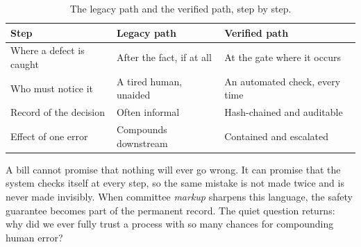 \begin{table}[H]
\footnotesize
\begin{tabularx}{\textwidth}{@{}L{4.0cm} Y Y@{}}
\toprule
\textbf{Step} & \textbf{Legacy path} & \textbf{Verified path}\\
\midrule
Where a defect is caught & After the fact, if at all & At the gate where it occurs\\
Who must notice it & A tired human, unaided & An automated check, every time\\
Record of the decision & Often informal & Hash-chained and auditable\\
Effect of one error & Compounds downstream & Contained and escalated\\
\bottomrule
\end{tabularx}
\caption{The legacy path and the verified path, step by step.}
\label{tab:fear}
\end{table}

A bill cannot promise that nothing will ever go wrong. It can promise that the
system checks itself at every step, so the same mistake is not made twice and is
never made invisibly. When committee \emph{markup} sharpens this language, the
safety guarantee becomes part of the permanent record. The quiet question returns:
why did we ever fully trust a process with so many chances for compounding human
error?
